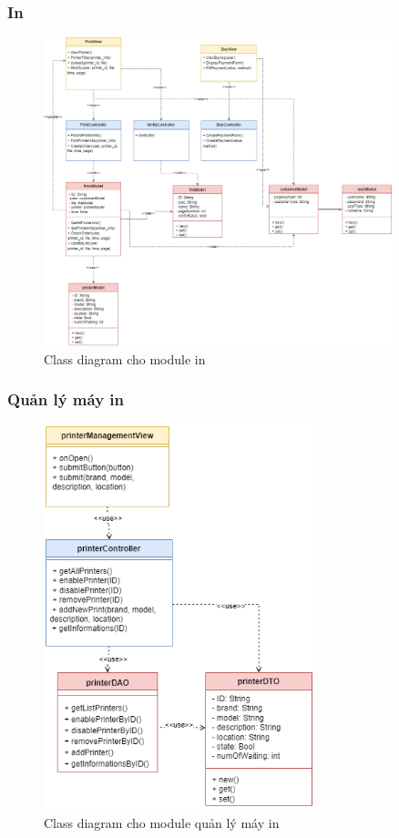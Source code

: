 \subsubsection{In}
\begin{figure}[H]
    \begin{center}
        \includegraphics[width=0.9\textwidth]{Images/System Modelling/Printing_Class.png}
        \caption{Class diagram cho module in}
    \end{center}
\end{figure}

\subsubsection{Quản lý máy in}
\begin{figure}[H]
    \begin{center}
        \includegraphics[width=0.7\textwidth]{Images/System Modelling/PM_Class.png}
        \caption{Class diagram cho module quản lý máy in}
        \label{fig:arch}
    \end{center}
\end{figure}
